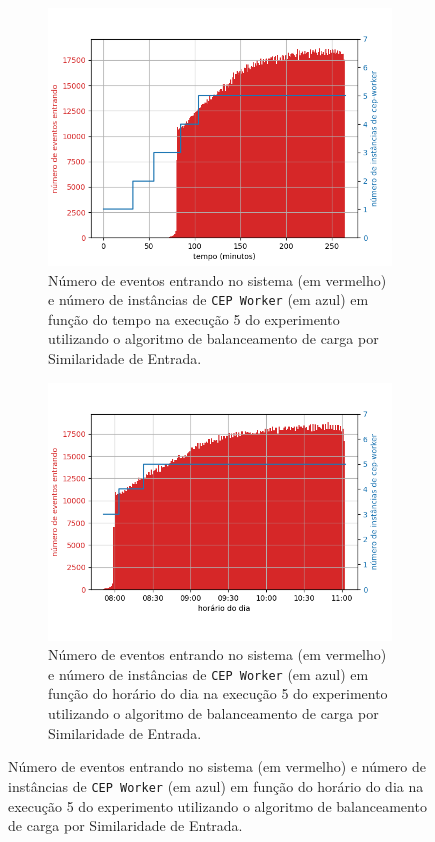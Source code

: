 \begin{figure}[h]
\begin{subfigure}{0.9\textwidth}
\includegraphics[width=\textwidth]{figuras/graphics/carga_e_workers_total10-dez-is.png}
\caption{Número de eventos entrando no sistema (em vermelho) e número de instâncias de \texttt{CEP Worker} (em azul) em função do tempo na execução 5 do experimento utilizando o algoritmo de balanceamento de carga por Similaridade de Entrada.}
\label{fig:workers_and_load_total-10-dez-is}
\end{subfigure}

\begin{subfigure}{\textwidth}
\includegraphics[width=\textwidth]{figuras/graphics/carga_e_workers_horario10-dez-is.png}
\caption{Número de eventos entrando no sistema (em vermelho) e número de instâncias de \texttt{CEP Worker} (em azul) em função do horário do dia na execução 5 do experimento utilizando o algoritmo de balanceamento de carga por Similaridade de Entrada.}
\label{fig:workers_and_load_SPtrans-10-dez-is}
\end{subfigure}%
\end{figure}



